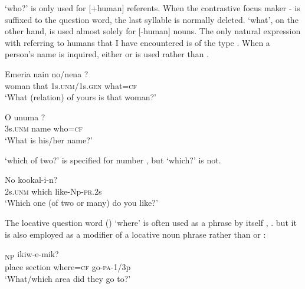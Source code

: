  `who?' is only used for [+human] referents. When the contrastive focus maker - is suffixed to the question word, the last syllable is normally deleted.  `what', on the other hand, is used almost solely for [-human] nouns. The only natural expression with  referring to humans that I have encountered is of the type . When a person's name is inquired, either   or   is used rather than .

\ea%
\label{ex:3:x649}
\gll Emeria nain no/nena ? \\
woman that 1s.\textsc{unm}/1s.\textsc{gen} what=\textsc{cf}\\
\glt`What (relation) of yours is that woman?'
\z

\ea%
\label{ex:3:x1855}
\gll O unuma ? \\
3s.\textsc{unm} name who=\textsc{cf}\\
\glt`What is his/her name?'
\z

 `which of two?' is specified for number , but  `which?' is not.

\ea%
\label{ex:3:x691}
\gll No  kookal-i-n? \\
2s.\textsc{unm} which like-Np-\textsc{pr}.2s\\
\glt`Which one (of two or many) do you like?'
\z

The locative question word () `where' is often used as a phrase by itself , . but it is also employed as a modifier of a locative noun phrase rather than  or : 

\ea%
\label{ex:3:x1853}
\gll [Epa ara \textstyleEmphasizedVernacularWords{kaan=eke}]\textsubscript{NP} ikiw-e-mik? \\
place section where=\textsc{cf} go-\textsc{pa}-1/3p\\
\glt`What/which area did they go to?'
\z

